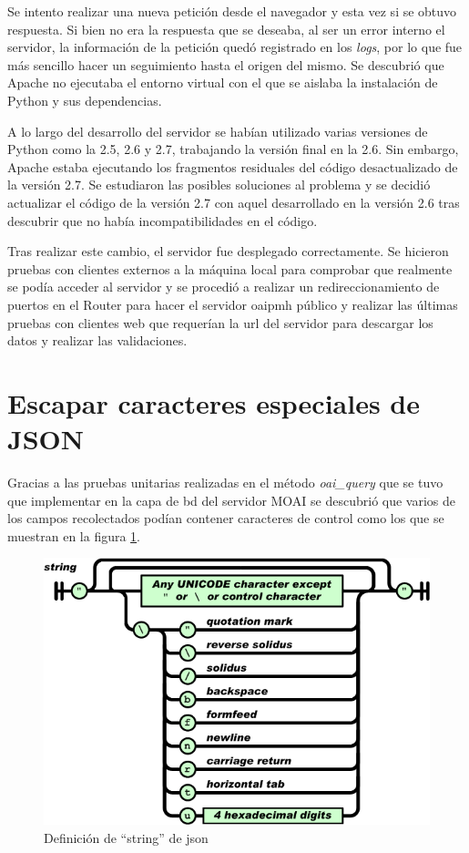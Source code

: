 Se intento realizar una nueva petición desde el navegador y esta vez si se obtuvo respuesta. Si bien no era la respuesta que se deseaba, al ser un error interno el servidor, la información de la petición quedó registrado en los \textit{logs}, por lo que fue más sencillo hacer un seguimiento hasta el origen del mismo. Se descubrió que Apache no ejecutaba el entorno virtual con el que se aislaba la instalación de Python y sus dependencias. 

A lo largo del desarrollo del servidor se habían utilizado varias versiones de Python como la 2.5, 2.6 y 2.7, trabajando la versión final en la 2.6. Sin embargo, Apache estaba ejecutando los fragmentos residuales del código desactualizado de la versión 2.7. Se estudiaron las posibles soluciones al problema y se decidió actualizar el código de la versión 2.7 con aquel desarrollado en la versión 2.6 tras descubrir que no había incompatibilidades en el código.

Tras realizar este cambio, el servidor fue desplegado correctamente. Se hicieron pruebas con clientes externos a la máquina local para comprobar que realmente se podía acceder al servidor y se procedió a realizar un redireccionamiento de puertos en el Router para hacer el servidor \acrshort{oaipmh} público y realizar las últimas pruebas con clientes web que requerían la \acrshort{url} del servidor para descargar los datos y realizar las validaciones.

\section{Escapar caracteres especiales de JSON}

Gracias a las pruebas unitarias realizadas en el método \textit{oai\_query} que se tuvo que implementar en la capa de \acrshort{bd} del servidor MOAI se descubrió que varios de los campos recolectados podían contener caracteres de control como los que se muestran en la figura \ref{fig:json_string}.

\begin{figure}[!htbp]
	\centering
	\includegraphics[scale=0.5]{fig/json_string}
	\caption{Definición de ``string'' de \acrshort{json}}
	\label{fig:json_string}
\end{figure}


